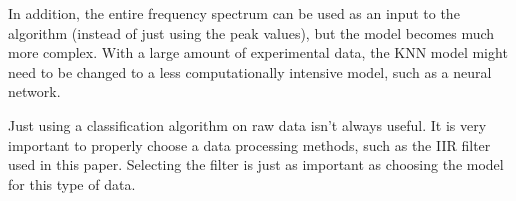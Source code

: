In addition, the entire frequency spectrum can be used as an input to the algorithm (instead of just using the peak values), but the model becomes much more complex.  With a large amount of experimental data, the KNN model might need to be changed to a less computationally intensive model, such as a neural network.

Just using a classification algorithm on raw data isn't always useful.  It is very important to properly choose a data processing methods, such as the IIR filter used in this paper.  Selecting the filter is just as important as choosing the model for this type of data.












